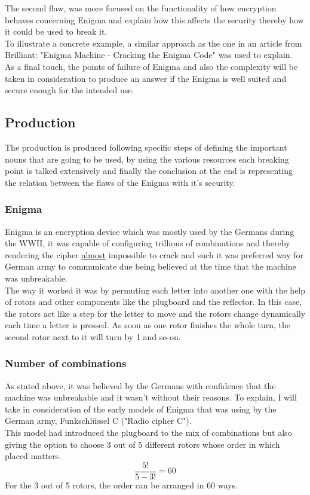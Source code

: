 \documentclass[conference,compsoc]{IEEEtran}
\begin{document}
The second flaw, was more focused on the functionality of how encryption behaves concerning Enigma and explain how this affects the security thereby how it could be used to break it.\\
To illustrate a concrete example, a similar approach as the one in an article from Brilliant: "Enigma Machine - Cracking the Enigma Code" was used to explain.\\

As a final touch, the points of failure of Enigma and also the complexity will be taken in consideration to produce an answer if the Enigma is well suited and secure enough for the intended use.\\

\subsection{Production}

The production is produced following specific steps of defining the important nouns that are going to be used, by using the various resources each breaking point is talked extensively and finally the conclusion at the end is representing the relation between the flaws of the Enigma with it's security.\\  

\subsubsection{Enigma} Enigma is an encryption device which was mostly used by the Germans during the WWII, it was capable of configuring trillions of combinations and thereby rendering the cipher \underline{almost} impossible to crack and such it was preferred way for German army to communicate due being believed at the time that the machine was unbreakable.\\
The way it worked it was by permuting each letter into another one with the help of rotors and other components like the plugboard and the reflector. In this case, the rotors act like a step for the letter to move and the rotors change dynamically each time a letter is pressed. As soon as one rotor finishes the whole turn, the second rotor next to it will turn by 1 and so-on.\\

\subsubsection{Number of combinations}
As stated above, it was believed by the Germans with confidence that the machine was unbreakable and it wasn't without their reasons. To explain, I will take in consideration of the early models of Enigma that was using by the German army, Funkschlüssel C ("Radio cipher C").\\
This model had introduced the plugboard to the mix of combinations but also giving the option to choose 3 out of 5 different rotors whose order in which placed matters.\\
\begin{equation}
    \frac{5!}{5-3!}=60
\end{equation}
For the 3 out of 5 rotors, the order can be arranged in 60 ways.\\
\end{document}

